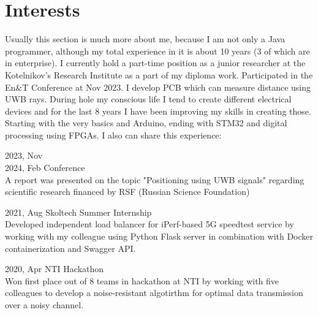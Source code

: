\documentclass[]{cv-style}          %
\begin{document}
\section{Interests}
{\vspace{0.05cm}}
Usually this section is much more about me, because I am not only a Java programmer, although my total experience in it is about 10 years (3 of which are in enterprise).
I currently hold a part-time position as a junior researcher at the Kotelnikov's Research Institute as a part of my diploma work. Participated in the En&T Conference at Nov 2023. I develop PCB which can measure distance using UWB rays. During hole my conscious life I tend to create different electrical devices and for the last 8 years I have been improving my skills in creating those. Starting with the very basics and Arduino, ending with STM32 and digital processing using FPGAs.
I also can share this experience:

\begin{entrylist}

\entrySkoltech
{2023, Nov\\2024, Feb}
{ Conference}
{
\\
A report was presented on the topic "Positioning using UWB signals" regarding scientific research financed by RSF (Russian Science Foundation) 
}


\entrySkoltech
{2021, Aug}
{Skoltech Summer Internship}
{
\\
Developed independent load balancer for iPerf-based 5G speedtest service by working with my colleague using Python Flask server in combination with Docker containerization and Swagger API.
}



\entry
    {2020, Apr}
    {NTI Hackathon}
    {}
    {\\
Won first place out of 8 teams in hackathon at NTI by working with five colleagues to develop a noise-resistant algotirthm for optimal data transmission over a noisy channel.
    }
    
    

\end{entrylist}


\end{document}
